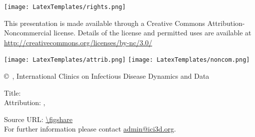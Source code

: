 {\topBar\sponsorBar

\begin{frame}

\begin{centering}

\vspace{6ex}\texttt{[image: LatexTemplates/rights.png]}

\vfill

{
	\tiny\linespread{12}
	This presentation is made available through a Creative Commons Attribution-Noncommercial license.
	Details of the license and permitted uses are available at \url{http://creativecommons.org/licenses/by-nc/3.0/} \par
}

\smallskip
\texttt{[image: LatexTemplates/attrib.png]}
\hspace{3em}
\texttt{[image: LatexTemplates/noncom.png]}

{\tiny\copyright\ \years, International Clinics on Infectious Disease Dynamics and Data}

\vfill

{\footnotesize
	Title: \inserttitle \\
	Attribution: \insertauthor, \insertdate 
	\par
}

\bigskip

{
	\scriptsize Source URL: \url{\figshare} \\
	For further information please contact \url{admin@ici3d.org}.
	\par
}

\vfill

\end{centering}

\end{frame}

}
